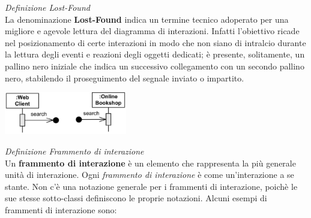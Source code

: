 \documentclass{article}
\begin{document}
\textit{Definizione Lost-Found}\\
La denominazione \textbf{Lost-Found} indica un termine tecnico adoperato per una migliore e agevole lettura del diagramma di interazioni. Infatti l'obiettivo ricade nel posizionamento di certe interazioni in modo che non siano di intralcio durante la lettura degli eventi e reazioni degli oggetti dedicati; è presente, solitamente, un pallino nero iniziale che indica un successivo collegamento con un secondo pallino nero, stabilendo il proseguimento del segnale inviato o impartito.\vspace*{14pt}
\begin{center}
    \includegraphics[width=0.4\textwidth]{foto 9.png}\\
\end{center}
\textit{Definizione Frammento di interazione}\\
Un \textbf{frammento di interazione} è un elemento che rappresenta la più generale unità di interazione. Ogni \textit{frammento di interazione} è come un'interazione a se stante. Non c'è una notazione generale per i frammenti di interazione, poichè le sue stesse sotto-classi definiscono le proprie notazioni. Alcuni esempi di frammenti di interazione sono:
\end{document}
